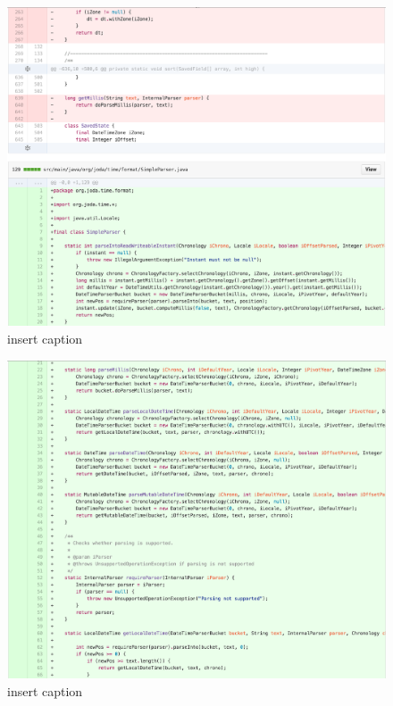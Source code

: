 \begin{figure}[H]
	\centering
	\includegraphics[width=\linewidth]{code72}
	\caption{insert caption}
\end{figure}
\begin{figure}[H]
	\centering
	\includegraphics[width=\linewidth]{code73}
	\caption{insert caption}
\end{figure}

